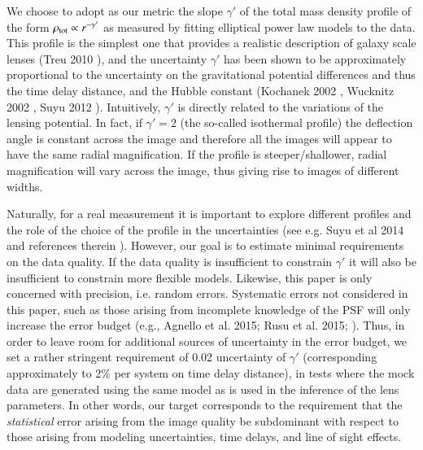\documentclass[a4paper,11pt]{article}
\begin{document}
We choose to adopt as our metric the slope $\gamma'$ of the total mass
density profile of the form $\rho_{\rm tot}\propto r^{-\gamma'}$ as
measured by fitting elliptical power law models to the data. This
profile is the simplest one that provides a realistic description of
galaxy scale lenses (Treu 2010 \citep{2010ARA&A..48...87T}), and the
uncertainty $\gamma'$ has been shown to be approximately proportional
to the uncertainty on the gravitational potential differences and thus
the time delay distance, and the Hubble constant (Kochanek 2002
\citep{2002ApJ...578...25K}, Wucknitz 2002
\citep{2002MNRAS.332..951W}, Suyu 2012
\citep{2012MNRAS.426..868S}).  Intuitively, $\gamma'$ is directly
related to the variations of the lensing potential. In fact, if
$\gamma'=2$ (the so-called isothermal profile) the deflection angle is
constant across the image and therefore all the images will appear to
have the same radial magnification. If the profile is
steeper/shallower, radial magnification will vary across the image,
thus giving rise to images of different widths.

Naturally, for a real measurement it is important to explore different
profiles and the role of the choice of the profile in the
uncertainties (see e.g. Suyu et al 2014 and references therein
\cite{2014ApJ...788L..35S}). However, our goal is to estimate minimal
requirements on the data quality. If the data quality is insufficient
to constrain $\gamma'$ it will also be insufficient to constrain more
flexible models. Likewise, this paper is only concerned with
precision, i.e. random errors. Systematic errors not considered in
this paper, such as those arising from incomplete knowledge of the PSF
will only increase the error budget (e.g., Agnello et al. 2015; Rusu
et al. 2015;
\citep{2015arXiv150602720A,2015arXiv150605147R}).
%
Thus, in order to leave room for additional sources of uncertainty in
the error budget, we set a rather stringent requirement of 0.02
uncertainty of $\gamma'$ (corresponding approximately to 2\% per
system on time delay distance), in tests where the mock data are
generated using the same model as is used in the inference of the lens
parameters. In other words, our target corresponds to the requirement
that the {\it statistical} error arising from the image quality be
subdominant with respect to those arising from modeling uncertainties,
time delays, and line of sight effects.
\end{document}
